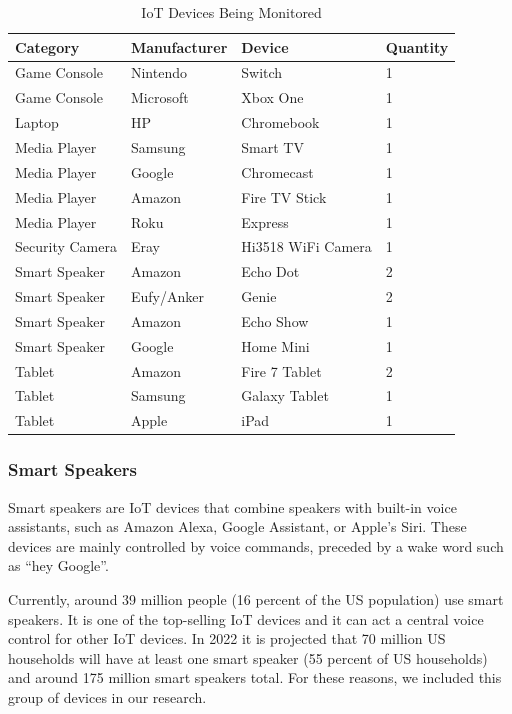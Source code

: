 \begin{table}[H]
    \centering
    \caption{IoT Devices Being Monitored}
    \begin{tabular}{@{}llll@{}}
    \toprule
    Category & Manufacturer & Device        & Quantity \\ \midrule
    Game Console & Nintendo     & Switch        & 1        \\
    Game Console & Microsoft    & Xbox One      & 1        \\
    Laptop & HP           & Chromebook    & 1        \\
    Media Player & Samsung      & Smart TV      & 1        \\
    Media Player & Google       & Chromecast    & 1        \\
    Media Player & Amazon       & Fire TV Stick    & 1        \\
    Media Player & Roku         & Express       & 1        \\
    Security Camera & Eray    & Hi3518 WiFi Camera     & 1        \\
    Smart Speaker & Amazon       & Echo Dot      & 2        \\
    Smart Speaker & Eufy/Anker   & Genie         & 2        \\
    Smart Speaker & Amazon       & Echo Show     & 1        \\
    Smart Speaker & Google       & Home Mini     & 1        \\
    Tablet & Amazon       & Fire 7 Tablet & 2        \\
    Tablet & Samsung      & Galaxy Tablet & 1        \\
    Tablet & Apple        & iPad          & 1        \\ \bottomrule
    \end{tabular}
    \label{tab:devices}
\end{table}

\subsubsection{Smart Speakers}
\label{Smart Speakers}

Smart speakers are IoT devices that combine speakers with built-in voice assistants, such as Amazon Alexa, Google Assistant, or Apple's Siri. These devices are mainly controlled by voice commands, preceded by a wake word such as ``hey Google''.

Currently, around 39 million people (16 percent of the US population) use smart speakers\cite{perez_2017}. It is one of the top-selling IoT devices and it can act a central voice control for other IoT devices. In 2022 it is projected that 70 million US households will have at least one smart speaker (55 percent of US households) and around 175 million smart speakers total\cite{perez_2018}. For these reasons, we included this group of devices in our research.

